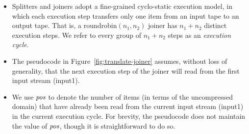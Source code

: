 \begin{itemize}

\item Splitters and joiners adopt a fine-grained cyclo-static
  execution model, in which each execution step transfers only one
  item from an input tape to an output tape.  That is, a
  roundrobin$(n_1, n_2)$ joiner has $n_1 + n_2$ distinct execution
  steps.  We refer to every group of $n_1 + n_2$ steps as an {\it
    execution cycle}.

\item The pseudocode in Figure~\ref{fig:translate-joiner} assumes,
  without loss of generality, that the next execution step of the
  joiner will read from the first input stream (input1).

\item We use $\mbox{\it pos}$ to denote the number of items (in terms of the
  uncompressed domain) that have already been read from the current
  input stream (input1) in the current execution cycle.  For brevity,
  the pseudocode does not maintain the value of $\mbox{\it pos}$, though it is
  straightforward to do so.

\end{itemize}

